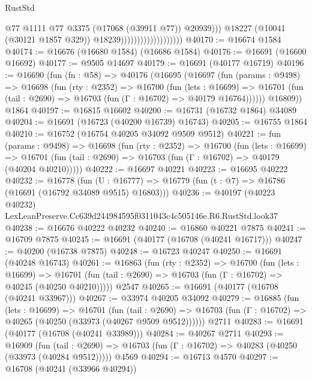 \begin{lexlean}{RustStd}
\begin{coremodule}
                                                @77
                                                @1111
                                                @77
                                                @3375
                                                (@17068 (@39911 @77))
                                                @20939)))
                                          @18227
                                          (@10041 (@30121 @1857 @329))
                                          @18239)))))))))))))))))))
@40170 := @16674 @1584
@40174 := @16676 (@16680 @1584) (@16686 @1584)
@40176 := @16691 (@16600 @16692)
@40177 := @9505 @14697
@40179 := @16691 (@40177 @16719)
@40196 := @16690
    (fun (fn : @58) =>
    @40176
      (@16695
        (@16697
          (fun (params : @9498) =>
          @16698
            (fun (rty : @2352) =>
            @16700
              (fun (lets : @16699) =>
              @16701 (fun (tail : @2690) => @16703 (fun (Γ : @16702) => @40179 @16764))))))
        @16809))
    @1864
@40197 := @16815 @16602
@40200 := @16731 (@16732 @1864) @34089
@40204 := @16691 (@16723 (@40200 @16739) @16743)
@40205 := @16755 @1864
@40210 := @16752 (@16754 @40205 @34092 @9509 @9512)
@40221 := fun (params : @9498) =>
  @16698
    (fun (rty : @2352) =>
    @16700
      (fun (lets : @16699) =>
      @16701 (fun (tail : @2690) => @16703 (fun (Γ : @16702) => @40179 (@40204 @40210)))))
@40222 := @16697 @40221
@40223 := @16695 @40222
@40232 := @16778
    (fun (U : @16777) => @16779 (fun (t : @7) => @16786 (@16691 (@16792 @34089 @9515) @16803)))
@40236 := @40197 (@40223 @40232) LexLeanPreserve.Cc639d244984595f0311043c4c505146e.R6.RustStd.look37
@40238 := @16676 @40222 @40232
@40240 := @16860 @40221 @7875
@40241 := @16709 @7875
@40245 := @16691 (@40177 (@16708 (@40241 @16717)))
@40247 := @40200 (@16738 @7875)
@40248 := @16723 @40247
@40250 := @16691 (@40248 @16743)
@40261 := @16863
    (fun (rty : @2352) =>
    @16700
      (fun (lets : @16699) =>
      @16701 (fun (tail : @2690) => @16703 (fun (Γ : @16702) => @40245 (@40250 @40210)))))
    @2547
@40265 := @16691 (@40177 (@16708 (@40241 @33967)))
@40267 := @33974 @40205 @34092
@40279 := @16885
    (fun (lets : @16699) =>
    @16701
      (fun (tail : @2690) =>
      @16703 (fun (Γ : @16702) => @40265 (@40250 (@33973 (@40267 @9509 @9512))))))
    @2711
@40283 := @16691 (@40177 (@16708 (@40241 @33989)))
@40284 := @40267 @2711
@40293 := @16909
    (fun (tail : @2690) => @16703 (fun (Γ : @16702) => @40283 (@40250 (@33973 (@40284 @9512)))))
    @4569
@40294 := @16713 @4570
@40297 := @16708 (@40241 (@33966 @40294))

\end{coremodule}
\end{lexlean}

